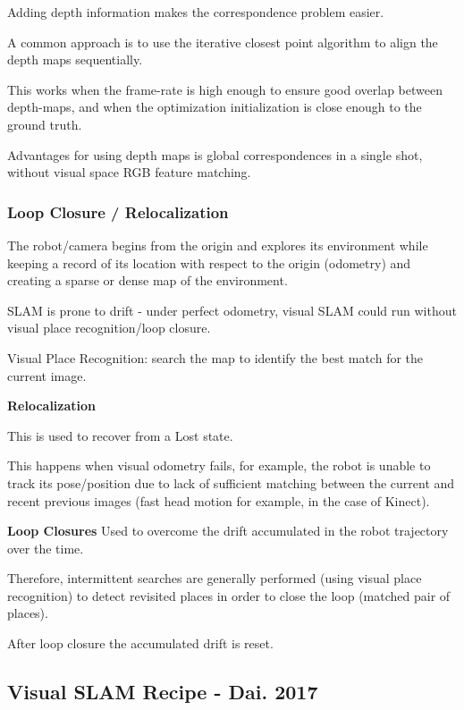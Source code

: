 Adding depth information makes the correspondence problem easier. 

A common approach is to use the iterative closest point algorithm to align the  depth maps sequentially. 

This works when the frame-rate is high enough to ensure good overlap between  depth-maps, and when the optimization initialization is close enough to the ground truth.

Advantages for using depth maps is global correspondences in a single shot, without visual space RGB feature matching.

\subsubsection{Loop Closure / Relocalization}

The robot/camera begins from the origin and explores its environment while keeping a record of its location with respect to the origin (odometry) and creating a sparse or dense map of the environment. 

SLAM is prone to drift - under perfect odometry, visual SLAM could run without visual place recognition/loop closure.

Visual Place Recognition: search the map to identify the best match for the current image. 

\textbf{Relocalization}

This is used to recover from a Lost state. 

This happens when visual odometry fails, for example, the robot is unable to track its pose/position due to lack of sufficient matching between the current and recent previous images (fast head motion for example, in the case of Kinect). 

\textbf{Loop Closures}
Used to overcome the drift accumulated in the robot trajectory over the time. 

Therefore, intermittent searches are generally performed (using visual place recognition) to detect revisited places in order to close the loop (matched pair of places). 

After loop closure the accumulated drift is reset.

\subsection{Visual SLAM Recipe - Dai. 2017}

